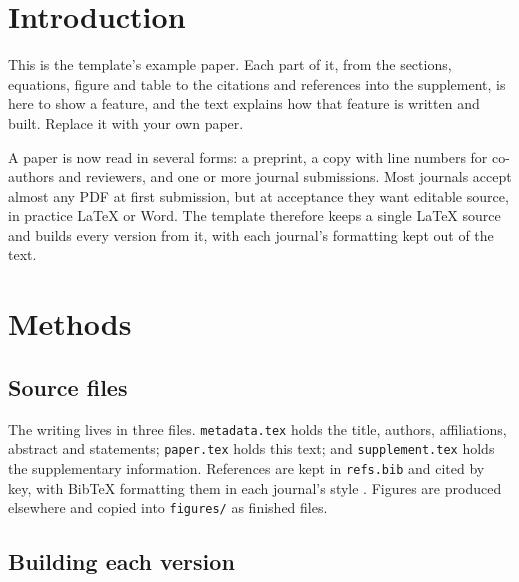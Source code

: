 
\section{Introduction}\label{sec:intro}

This is the template's example paper. Each part of it, from the sections,
equations, figure and table to the citations and references into the
supplement, is here to show a feature, and the text explains how that feature
is written and built. Replace it with your own paper.

A paper is now read in several forms: a preprint, a copy with line numbers for
co-authors and reviewers, and one or more journal submissions. Most journals
accept almost any PDF at first submission, but at acceptance they want editable
source, in practice LaTeX \citep{lamport1994} or Word. The template therefore
keeps a single LaTeX source and builds every version from it, with each
journal's formatting kept out of the text.

\section{Methods}\label{sec:methods}

\subsection{Source files}

The writing lives in three files. \texttt{metadata.tex} holds the title,
authors, affiliations, abstract and statements; \texttt{paper.tex} holds this
text; and \texttt{supplement.tex} holds the supplementary information.
References are kept in \texttt{refs.bib} and cited by key, with BibTeX
formatting them in each journal's style \citep{patashnik1988}. Figures are
produced elsewhere and copied into \texttt{figures/} as finished files.

\subsection{Building each version}

